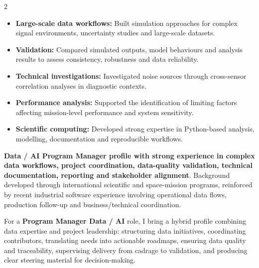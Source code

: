 \documentclass[8pt,a4paper,ragged2e,withhyper]{altacv}
\begin{document}
\begin{paracol}{2}
\begin{itemize}
  \item \textbf{Large-scale data workflows:} Built simulation approaches for complex signal environments, uncertainty studies and large-scale datasets.
  \item \textbf{Validation:} Compared simulated outputs, model behaviours and analysis results to assess consistency, robustness and data reliability.
  \item \textbf{Technical investigations:} Investigated noise sources through cross-sensor correlation analyses in diagnostic contexts.
  \item \textbf{Performance analysis:} Supported the identification of limiting factors affecting mission-level performance and system sensitivity.
  \item \textbf{Scientific computing:} Developed strong expertise in Python-based analysis, modelling, documentation and reproducible workflows.
\end{itemize}



\switchcolumn



\textbf{Data / AI Program Manager profile with strong experience in complex data workflows, project coordination, data-quality validation, technical documentation, reporting and stakeholder alignment}. Background developed through international scientific and space-mission programs, reinforced by recent industrial software experience involving operational data flows, production follow-up and business/technical coordination.

For a \textbf{Program Manager Data / AI} role, I bring a hybrid profile combining data expertise and project leadership: structuring data initiatives, coordinating contributors, translating needs into actionable roadmaps, ensuring data quality and traceability, supervising delivery from cadrage to validation, and producing clear steering material for decision-making.


\end{paracol}
\end{document}
